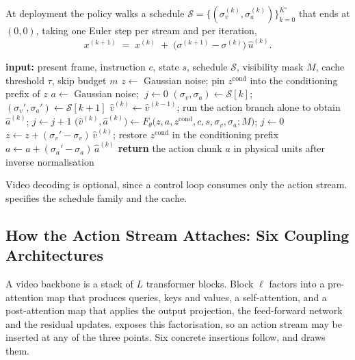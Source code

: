 At deployment the policy walks a schedule
$\mathcal{S} = \{(\sigma_v^{(k)}, \sigma_a^{(k)})\}_{k=0}^{K'}$ that ends at
$(0,0)$, taking one Euler step per stream and per iteration,
\begin{equation}
  x^{(k+1)} \;=\; x^{(k)} \;+\; \big(\sigma^{(k+1)} - \sigma^{(k)}\big)\,
  \hat{u}^{(k)} .
  \label{eq:euler}
\end{equation}
\begin{algorithm}[t]
\caption{Joint denoising with a free level schedule and a velocity cache}
\label{alg:sample}
\begin{algorithmic}[1]
\STATE \textbf{input:} present frame, instruction $c$, state $s$, schedule
  $\mathcal{S}$, visibility mask $M$, cache threshold $\tau$, skip budget $m$
\STATE $z \leftarrow$ Gaussian noise; pin $z^{\text{cond}}$ into the conditioning prefix of $z$
\STATE $a \leftarrow$ Gaussian noise; $\; j \leftarrow 0$
  \STATE $(\sigma_v, \sigma_a) \leftarrow \mathcal{S}[k]$;\enspace
         $(\sigma_v', \sigma_a') \leftarrow \mathcal{S}[k+1]$
    \STATE $\hat{v}^{(k)} \leftarrow \hat{v}^{(k-1)}$;\enspace
           run the action branch alone to obtain $\hat{a}^{(k)}$;\enspace
           $j \leftarrow j + 1$
  \ELSE
    \STATE $\big(\hat{v}^{(k)}, \hat{a}^{(k)}\big) \leftarrow
            F_\theta\big(z, a, z^{\text{cond}}, c, s, \sigma_v, \sigma_a; M\big)$;\enspace
           $j \leftarrow 0$
  \ENDIF
  \STATE $z \leftarrow z + (\sigma_v' - \sigma_v)\, \hat{v}^{(k)}$;\enspace
         restore $z^{\text{cond}}$ in the conditioning prefix
  \STATE $a \leftarrow a + (\sigma_a' - \sigma_a)\, \hat{a}^{(k)}$
\ENDFOR
\STATE \textbf{return} the action chunk $a$ in physical units after inverse normalisation
\end{algorithmic}
\end{algorithm}
Video decoding is optional, since a control loop consumes only the action
stream.  specifies the schedule family and the cache.

\subsection{How the Action Stream Attaches: Six Coupling Architectures}
\label{sec:coupling}

A video backbone is a stack of $L$ transformer blocks. Block $\ell$ factors into
a pre-attention map that produces queries, keys and values, a self-attention, and
a post-attention map that applies the output projection, the feed-forward network
and the residual updates. \sys{} exposes this factorisation, so an action stream
may be inserted at any of the three points. Six concrete insertions follow, and
 draws them.

